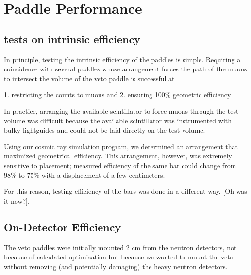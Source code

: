 



\section{Paddle Performance}
\subsection{tests on intrinsic efficiency}

In principle, testing the intrinsic efficiency of the paddles is simple.  Requiring a coincidence with several paddles whose arrangement forces the path of the muons to intersect the volume of the veto paddle is successful at 

1. restricting the counts to muons and
2. ensuring 100\% geometric efficiency

In practice, arranging the available scintillator to force muons through the test volume was difficult because the available scintillator was instrumented with bulky lightguides and could not be laid directly on the test volume.

Using our cosmic ray simulation program, we determined an arrangement that maximized geometrical efficiency.  This arrangement, however, was extremely sensitive to placement; measured efficiency of the same bar could change from 98\% to 75\% with a displacement of a few centimeters.

For this reason, testing efficiency of the bars was done in a different way.  [Oh was it now?].

\subsection{On-Detector Efficiency}

The veto paddles were initially mounted 2 cm from the neutron detectors, not because of calculated optimization but because we wanted to mount the veto without removing (and potentially damaging) the heavy neutron detectors.

